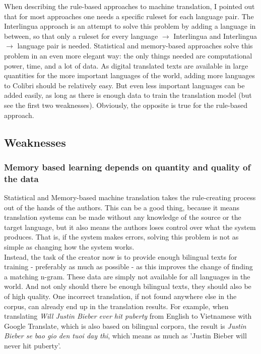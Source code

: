 \documentclass[12pt]{article}
\begin{document}
When describing the rule-based approaches to machine translation, I pointed out that for most approaches one needs a specific ruleset for each language pair. The Interlingua approach is an attempt to solve this problem by adding a language in between, so that only a ruleset for every language $\rightarrow$ Interlingua and Interlingua $\rightarrow$ language pair is needed. Statistical and memory-based approaches solve this problem in an even more elegant way: the only things needed are computational power, time, and a lot of data. As digital translated texts are available in large quantities for the more important languages of the world, adding more languages to Colibri should be relatively easy. But even less important languages can be added easily, as long as there is enough data to train the translation model (but see the first two weaknesses). Obviously, the opposite is true for the rule-based approach.

\subsection{Weaknesses}

\subsubsection{Memory based learning depends on quantity and quality of the data}

Statistical and Memory-based machine translation takes the rule-creating process out of the hands of the authors. This can be a good thing, because it means translation systems can be made without any knowledge of the source or the target language, but it also means the authors loses control over what the system produces. That is, if the system makes errors, solving this problem is not as simple as changing how the system works. \\\indent
Instead, the task of the creator now is to provide enough bilingual texts for training - preferably as much as possible - as this improves the change of finding a matching n-gram. These data are simply not available for all languages in the world. And not only should there be enough bilingual texts, they should also be of high quality. One incorrect translation, if not found anywhere else in the corpus, can already end up in the translation results. For example, when translating \emph{Will Justin Bieber ever hit puberty} from English to Vietnamese with Google Translate, which is also based on bilingual corpora, the result is \emph{Justin Bieber se bao gio den tuoi day thi}, which means as much as 'Justin Bieber will never hit puberty'.
\end{document}
